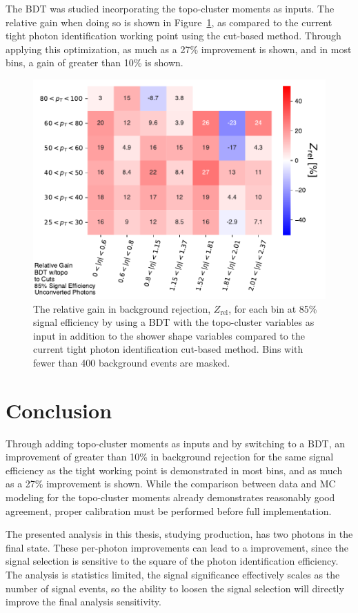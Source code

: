 The \gls{BDT} was studied incorporating the topo-cluster moments as inputs. The relative gain when doing so is shown in Figure~\ref{fig:bdt-topo-vs-cuts}, as compared to the current tight photon identification working point using the cut-based method. Through applying this optimization, as much as a 27\% improvement is shown, and in most \etaPt bins, a gain of greater than 10\% is shown.
\begin{figure}[!htbp]
    \centering
    \includegraphics[width=.85\textwidth]{chapters/chapter4_photonID/images/BDTtopo_v_cuts_normed.pdf}
    \caption[The relative gain in background rejection by using a \gls{BDT} with topo-cluster variables compared to the current tight photon identification methods]
    {The relative gain in background rejection, $Z_{\text{rel}}$, for each \etaPt bin at 85\% signal efficiency by using a \gls{BDT} with the topo-cluster variables as input in addition to the shower shape variables compared to the current tight photon identification cut-based method. Bins with fewer than 400 background events are masked.}
    \label{fig:bdt-topo-vs-cuts}
\end{figure}

\section{Conclusion}

Through adding topo-cluster moments as inputs and by switching to a \gls{BDT}, an improvement of greater than 10\% in background rejection for the same signal efficiency as the tight working point is demonstrated in most \etaPt bins, and as much as a 27\% improvement is shown. While the comparison between data and \gls{MC} modeling for the topo-cluster moments already demonstrates reasonably good agreement, proper calibration must be performed before full implementation. 

The presented analysis in this thesis, studying \hhyybb production, has two photons in the final state. These per-photon improvements can lead to a improvement, since the signal selection is sensitive to the square of the photon identification efficiency. The analysis is statistics limited, the signal significance effectively scales as the number of signal events, so the ability to loosen the signal selection will directly improve the final analysis sensitivity.